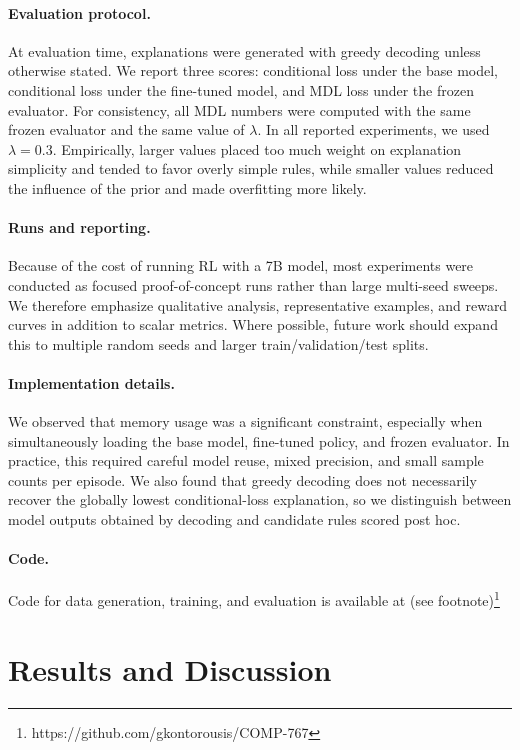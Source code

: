 \documentclass{article}
\theoremstyle{plain}
\theoremstyle{definition}
\theoremstyle{remark}
\begin{document}
\paragraph{Evaluation protocol.}
At evaluation time, explanations were generated with greedy decoding unless otherwise stated. We report three scores: conditional loss under the base model, conditional loss under the fine-tuned model, and MDL loss under the frozen evaluator. For consistency, all MDL numbers were computed with the same frozen evaluator and the same value of $\lambda$. In all reported experiments, we used $\lambda = 0.3$. Empirically, larger values placed too much weight on explanation simplicity and tended to favor overly simple rules, while smaller values reduced the influence of the prior and made overfitting more likely.

\paragraph{Runs and reporting.}
Because of the cost of running RL with a 7B model, most experiments were conducted as focused proof-of-concept runs rather than large multi-seed sweeps. We therefore emphasize qualitative analysis, representative examples, and reward curves in addition to scalar metrics. Where possible, future work should expand this to multiple random seeds and larger train/validation/test splits.

\paragraph{Implementation details.}
We observed that memory usage was a significant constraint, especially when simultaneously loading the base model, fine-tuned policy, and frozen evaluator. In practice, this required careful model reuse, mixed precision, and small sample counts per episode. We also found that greedy decoding does not necessarily recover the globally lowest conditional-loss explanation, so we distinguish between model outputs obtained by decoding and candidate rules scored post hoc.

\paragraph{Code.}
Code for data generation, training, and evaluation is available at (see footnote)\footnote{https://github.com/gkontorousis/COMP-767}


\section{Results and Discussion}
\end{document}
